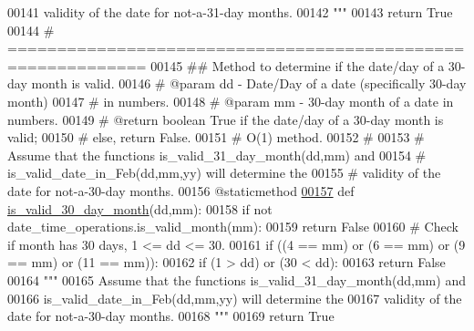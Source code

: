 \begin{DoxyCode}
00141 \textcolor{stringliteral}{                validity of the date for not-a-31-day months.}
00142 \textcolor{stringliteral}{        """}
00143         \textcolor{keywordflow}{return} \textcolor{keyword}{True}
00144     \textcolor{comment}{# ============================================================}
00145     \textcolor{comment}{##  Method to determine if the date/day of a 30-day month is valid.}
00146     \textcolor{comment}{#   @param dd - Date/Day of a date (specifically 30-day month)}
00147     \textcolor{comment}{#                   in numbers.}
00148     \textcolor{comment}{#   @param mm - 30-day month of a date in numbers.}
00149     \textcolor{comment}{#   @return boolean True if the date/day of a 30-day month is valid;}
00150     \textcolor{comment}{#       else, return False.}
00151     \textcolor{comment}{#   O(1) method.}
00152     \textcolor{comment}{#}
00153     \textcolor{comment}{#   Assume that the functions is\_valid\_31\_day\_month(dd,mm) and}
00154     \textcolor{comment}{#       is\_valid\_date\_in\_Feb(dd,mm,yy) will determine the}
00155     \textcolor{comment}{#       validity of the date for not-a-30-day months.}
00156     @staticmethod
\hypertarget{date__time__processing_8py_source_l00157}{}\hyperlink{classutilities_1_1date__time__processing_1_1date__time__operations_a15c6ea3d519b1665781fd9dcddec04a6}{00157}     \textcolor{keyword}{def }\hyperlink{classutilities_1_1date__time__processing_1_1date__time__operations_a15c6ea3d519b1665781fd9dcddec04a6}{is\_valid\_30\_day\_month}(dd,mm):
00158         \textcolor{keywordflow}{if} \textcolor{keywordflow}{not} date\_time\_operations.is\_valid\_month(mm):
00159             \textcolor{keywordflow}{return} \textcolor{keyword}{False}
00160         \textcolor{comment}{# Check if month has 30 days, 1 <= dd <= 30.}
00161         \textcolor{keywordflow}{if} ((4 == mm) \textcolor{keywordflow}{or} (6 == mm) \textcolor{keywordflow}{or} (9 == mm) \textcolor{keywordflow}{or} (11 == mm)):
00162             \textcolor{keywordflow}{if} (1 > dd) \textcolor{keywordflow}{or} (30 < dd):
00163                 \textcolor{keywordflow}{return} \textcolor{keyword}{False}
00164         \textcolor{stringliteral}{"""}
00165 \textcolor{stringliteral}{            Assume that the functions is\_valid\_31\_day\_month(dd,mm) and}
00166 \textcolor{stringliteral}{                is\_valid\_date\_in\_Feb(dd,mm,yy) will determine the}
00167 \textcolor{stringliteral}{                validity of the date for not-a-30-day months.}
00168 \textcolor{stringliteral}{        """}
00169         \textcolor{keywordflow}{return} \textcolor{keyword}{True}

\end{DoxyCode}

